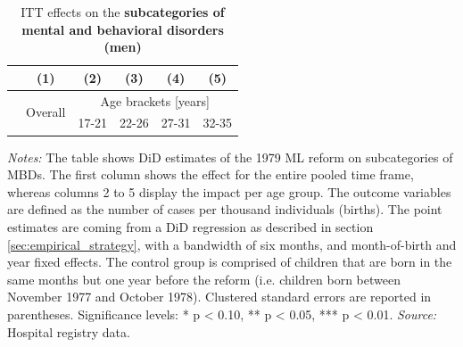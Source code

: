 \documentclass[11pt, a4paper, draft]{article} %
\begin{document}
\newpage
{} 
\vspace*{\fill}
\begin{table}[H] \centering 
	\begin{threeparttable} \centering \caption{ITT effects on the \textbf{subcategories of mental and behavioral disorders (men)}}\label{tab: ITT_across_d5subcategories_per_age_group_men}
		{\def\sym#1{\ifmmode^{#1}\else\(^{#1}\)\fi} 
			\begin{tabular}{l*{5}{c}}
				\toprule 
				&\multicolumn{1}{c}{(1)}&\multicolumn{1}{c}{(2)}&\multicolumn{1}{c}{(3)}&\multicolumn{1}{c}{(4)}&\multicolumn{1}{c}{(5)}\\
				\midrule
				&\multirow{2}{*}{Overall} & \multicolumn{4}{c}{Age brackets [years]} \\ 
				\cmidrule(lr){3-6}
				&&\multicolumn{1}{c}{17-21}&\multicolumn{1}{c}{22-26}&\multicolumn{1}{c}{27-31}&\multicolumn{1}{c}{32-35}\\
				
				\midrule
				
				
				
				\bottomrule 
		\end{tabular}}
	\end{threeparttable} 
	\begin{minipage}{0.9\linewidth}
		\scriptsize \emph{Notes:} The table shows DiD estimates of the 1979 ML reform on subcategories of MBDs. The first column shows the effect for the entire pooled time frame, whereas columns 2 to 5 display the impact per age group. The outcome variables are defined as the number of cases per thousand individuals (births). The point estimates are coming from a DiD regression as described in section \ref{sec:empirical_strategy}, with a bandwidth of six months, and month-of-birth and year fixed effects. The control group is comprised of children that are born in the same months but one year before the reform (i.e. children born between November 1977 and October 1978). Clustered standard errors are reported in parentheses. \newline Significance levels: * p < 0.10, ** p < 0.05, *** p < 0.01. \newline 	\emph{Source:} Hospital registry data.
	\end{minipage}
\end{table} 
\vspace*{\fill}\clearpage 
\restoregeometry
\end{document}
